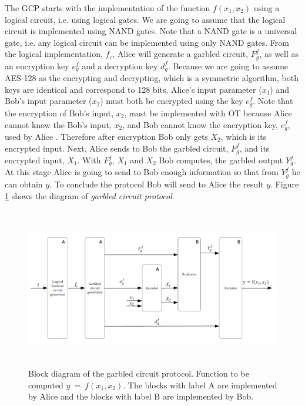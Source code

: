 \begin{refsection}
The GCP starts with the implementation of the function $f(x_1,x_2)$ using a logical circuit, i.e. using logical gates. We are going to assume that the logical circuit is implemented using NAND gates. Note that a NAND gate is a universal gate, i.e. any logical circuit can be implemented using only NAND gates. From the logical implementation, $f_c$, Alice will generate a garbled circuit, $F_g^f$, as well as an encryption key $e_g^f$ and a decryption key $d_g^f$. Because we are going to assume AES-128 as the encrypting and decrypting, which is a symmetric algorithm, both keys are identical and correspond to 128 bits. Alice's input parameter ($x_1$) and Bob's input parameter ($x_2$) must both be encrypted using the key $e_g^f$. Note that the encryption of Bob's input, $x_2$, must be implemented with OT because Alice cannot know the Bob's input, $x_2$, and Bob cannot know the encryption key, $e_g^f$, used by Alice \cite{Naumann16}. Therefore after encryption Bob only gets $X_2$, which is its encrypted input. Next, Alice sends to Bob the garbled circuit, $F_g^f$, and its encrypted input, $X_1$. With $F_g^f$, $X_1$ and $X_2$ Bob computes, the garbled output $Y_g^f$. At this stage Alice is going to send to Bob enough information so that from $Y_g^f$ he can obtain $y$. To conclude the protocol Bob will send to Alice the result $y$. Figure \ref{fig:garbledcircuit} shows the diagram of \textit{garbled circuit protocol}.

\begin{figure}[H]
	\centering
	\includegraphics[width=1\textwidth, height=7cm]{./sdf/secure_multiparty_computation/figures/garbled_circuit.png}
    \caption{Block diagram of the garbled circuit protocol. Function to be computed $y~=~f(x_1, x_2)$. The blocks with label A are implemented by Alice and the blocks with label B are implemented by Bob.}\label{fig:garbledcircuit}
\end{figure}



\end{refsection}
